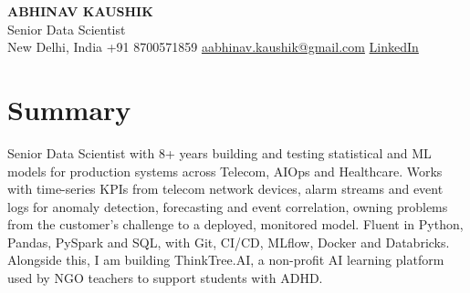 \documentclass[10pt,a4paper]{article}
\begin{document}
\begin{center}
  {\LARGE\bfseries ABHINAV KAUSHIK}\\[2pt]
  {\large Senior Data Scientist}\\[2pt]
  New Delhi, India \textbar{} +91 8700571859 \textbar{} \href{mailto:aabhinav.kaushik@gmail.com}{aabhinav.kaushik@gmail.com} \textbar{} \href{https://www.linkedin.com/in/abhinav-kaushik10/}{LinkedIn}  
\end{center}

\section{Summary}
Senior Data Scientist with 8+ years building and testing statistical and ML models for production systems across Telecom, AIOps and Healthcare. Works with time-series KPIs from telecom network devices, alarm streams and event logs for anomaly detection, forecasting and event correlation, owning problems from the customer's challenge to a deployed, monitored model. Fluent in Python, Pandas, PySpark and SQL, with Git, CI/CD, MLflow, Docker and Databricks. Alongside this, I am building ThinkTree.AI, a non-profit AI learning platform used by NGO teachers to support students with ADHD.
\end{document}

